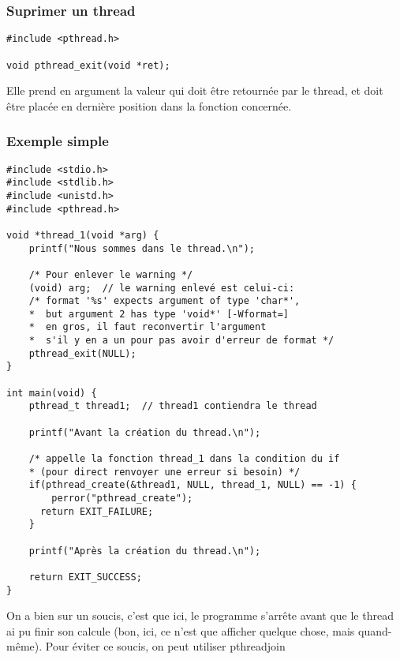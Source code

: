 \documentclass[a4paper]{article}
\begin{document}
\subsubsection{Suprimer un thread}
\begin{lstlisting}
#include <pthread.h>

void pthread_exit(void *ret);
\end{lstlisting}
Elle prend en argument la valeur qui doit être retournée par le thread, et doit être placée en dernière position dans la fonction concernée.
\newpage
\subsubsection{Exemple simple}
\begin{lstlisting}
#include <stdio.h>
#include <stdlib.h>
#include <unistd.h>
#include <pthread.h>

void *thread_1(void *arg) {
    printf("Nous sommes dans le thread.\n");

    /* Pour enlever le warning */
    (void) arg;  // le warning enlevé est celui-ci:
    /* format '%s' expects argument of type 'char*',
    *  but argument 2 has type 'void*' [-Wformat=]
    *  en gros, il faut reconvertir l'argument
    *  s'il y en a un pour pas avoir d'erreur de format */
    pthread_exit(NULL);
}

int main(void) {
    pthread_t thread1;  // thread1 contiendra le thread

    printf("Avant la création du thread.\n");

    /* appelle la fonction thread_1 dans la condition du if
    * (pour direct renvoyer une erreur si besoin) */
    if(pthread_create(&thread1, NULL, thread_1, NULL) == -1) {
	    perror("pthread_create");
      return EXIT_FAILURE;
    }

    printf("Après la création du thread.\n");

    return EXIT_SUCCESS;
}
\end{lstlisting}
On a bien sur un soucis, c'est que ici, le programme s'arrête avant que le thread ai pu finir son calcule (bon, ici, ce n'est que afficher quelque chose, mais quand-même). Pour éviter ce soucis, on peut utiliser \guillemotleft{} pthread\textunderscore{}join \guillemotright{}
\end{document}
